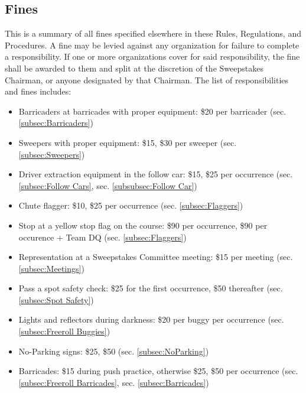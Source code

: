 \begin{appendices}
	\renewcommand\thesection{\Alph{section}.}
	\section{Fines}
		This is a summary of all fines specified elsewhere in these Rules, Regulations, and Procedures. A fine may be levied against any organization for failure to complete a responsibility. If one or more organizations cover for said responsibility, the fine shall be awarded to them and split at the discretion of the Sweepstakes Chairman, or anyone designated by that Chairman. The list of responsibilities and fines includes:

		\begin{itemize}

			\item Barricaders at barricades with proper equipment: \$20 per barricader (sec. \ref{subsec:Barricaders})
			
			\item Sweepers with proper equipment: \$15, \$30 per sweeper (sec. \ref{subsec:Sweepers})
			
			\item Driver extraction equipment in the follow car: \$15, \$25 per occurrence (sec. \ref{subsec:Follow Cars}, sec. \ref{subsubsec:Follow Car})
			
			\item Chute flagger: \$10, \$25 per occurrence (sec. \ref{subsec:Flaggers})
			
			\item Stop at a yellow stop flag on the course: \$90 per occurrence, \$90 per occurence + Team DQ (sec. \ref{subsec:Flaggers}) %

			\item Representation at a Sweepstakes Committee meeting: \$15 per meeting (sec. \ref{subsec:Meetings})

			\item Pass a spot safety check: \$25 for the first occurrence, \$50 thereafter (sec. \ref{subsec:Spot Safety})
			
			\item Lights and reflectors during darkness: \$20 per buggy per occurrence (sec. \ref{subsec:Freeroll Buggies})

			\item No-Parking signs: \$25, \$50 (sec. \ref{subsec:NoParking})
			
			\item Barricades: \$15 during push practice, otherwise \$25, \$50 per occurrence (sec. \ref{subsec:Freeroll Barricades}, sec. \ref{subsec:Barricades})


\end{itemize}
\end{appendices}
